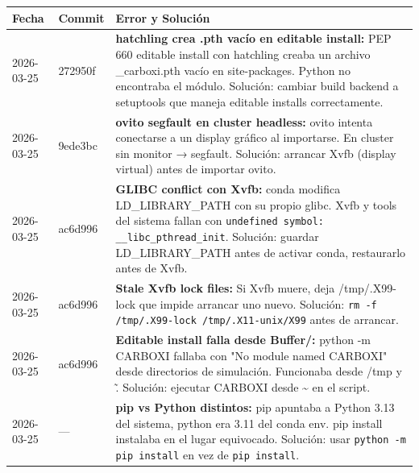 \documentclass[12pt,a4paper]{article}
\begin{document}
\begin{table}[H]
	\centering
	\begin{tabular}{@{}llp{9cm}@{}}
		\toprule
		\textbf{Fecha} & \textbf{Commit} & \textbf{Error y Solución}                                                                                                                                                                                                                                                       \\
		\midrule
		2026-03-25     & 272950f         & \textbf{hatchling crea .pth vacío en editable install:} PEP 660 editable install con hatchling creaba un archivo \_carboxi.pth vacío en site-packages. Python no encontraba el módulo. Solución: cambiar build backend a setuptools que maneja editable installs correctamente. \\
		2026-03-25     & 9ede3bc         & \textbf{ovito segfault en cluster headless:} ovito intenta conectarse a un display gráfico al importarse. En cluster sin monitor → segfault. Solución: arrancar Xvfb (display virtual) antes de importar ovito.                                                                 \\
		2026-03-25     & ac6d996         & \textbf{GLIBC conflict con Xvfb:} conda modifica LD\_LIBRARY\_PATH con su propio glibc. Xvfb y tools del sistema fallan con \texttt{undefined symbol: \_\_libc\_pthread\_init}. Solución: guardar LD\_LIBRARY\_PATH antes de activar conda, restaurarlo antes de Xvfb.          \\
		2026-03-25     & ac6d996         & \textbf{Stale Xvfb lock files:} Si Xvfb muere, deja /tmp/.X99-lock que impide arrancar uno nuevo. Solución: \texttt{rm -f /tmp/.X99-lock /tmp/.X11-unix/X99} antes de arrancar.                                                                                                 \\
		2026-03-25     & ac6d996         & \textbf{Editable install falla desde Buffer/:} python -m CARBOXI fallaba con "No module named CARBOXI" desde directorios de simulación. Funcionaba desde /tmp y \~. Solución: ejecutar CARBOXI desde \~{} en el script.                                                         \\
		2026-03-25     & ---             & \textbf{pip vs Python distintos:} pip apuntaba a Python 3.13 del sistema, python era 3.11 del conda env. pip install instalaba en el lugar equivocado. Solución: usar \texttt{python -m pip install} en vez de \texttt{pip install}.                                            \\
		\bottomrule
	\end{tabular}
\end{table}
\end{document}
